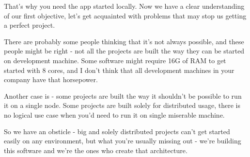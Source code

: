 \documentclass[11pt,a4paper,oneside]{article}
\begin{document}
That's why you need the app started locally. Now we have a clear understanding of our first objective, let's get acquainted with problems that may stop us getting a perfect project.

There are probably some people thinking that it's not always possible, and these people might be right - not all the projects are built the way they can be started on development machine. Some software might require 16G of RAM to get started with 8 cores, and I don't think that all development machines in your company have that horsepower. 

Another case is - some projects are built the way it shouldn't be possible to run it on a single node. Some projects are built solely for distributed usage, there is no logical use case when you'd need to run it on single miserable machine.

So we have an obsticle - big and solely distributed projects can't get started easily on any environment, but what you're usually missing out - we're building this software and we're the ones who create that architecture. 
\end{document}
